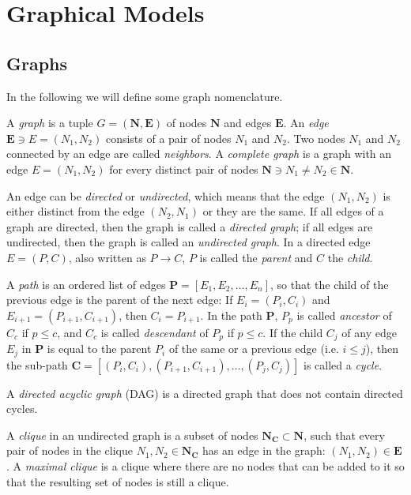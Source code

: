 \section{Graphical Models}

\subsection{Graphs}

In the following we will define some graph nomenclature.

A \emph{graph} is a tuple $G=(\mathbf{N},\mathbf{E})$
of nodes $\mathbf{N}$ and edges $\mathbf{E}$. An \emph{edge}
$\mathbf{E}\ni E=(N_{1},N_{2})$ consists of a pair of nodes $N_{1}$
and $N_{2}$. Two nodes $N_{1}$ and $N_{2}$ connected by an edge
are called \emph{neighbors}. A \emph{complete graph}
is a graph with an edge $E=(N_{1},N_{2})$ for every distinct pair
of nodes $\mathbf{N}\ni N_{1}\neq N_{2}\in\mathbf{N}$.

An edge can be \emph{directed} or \emph{undirected},
which means that the edge $(N_{1},N_{2})$ is either distinct from
the edge $(N_{2},N_{1})$ or they are the same. If all edges of a
graph are directed, then the graph is called a \emph{directed graph};
if all edges are undirected, then the graph is called an \emph{undirected
graph}. In a directed edge $E=(P,C)$, also
written as $P\rightarrow C$, $P$ is called the \emph{parent}
and $C$ the \emph{child}.

A \emph{path} is an ordered list of edges $\mathbf{P}=[E_{1},E_{2},\dots,E_{n}]$,
so that the child of the previous edge is the parent of the next edge:
If $E_{i}=(P_{i},C_{i})$ and $E_{i+1}=(P_{i+1},C_{i+1})$, then $C_{i}=P_{i+1}$.
In the path $\mathbf{P}$, $P_{p}$ is called \emph{ancestor}
of $C_{c}$ if $p\leq c$, and $C_{c}$ is called  \emph{descendant}
of $P_{p}$ if $p\leq c$. If the child $C_{j}$ of any edge $E_{j}$
in $\mathbf{P}$ is equal to the parent $P_{i}$ of the same or a
previous edge (i.e. $i\leq j$), then the sub-path $\mathbf{C}=[(P_{i},C_{i}),(P_{i+1},C_{i+1}),\dots,(P_{j},C_{j})]$
is called a \emph{cycle}.

A \emph{directed acyclic graph} (DAG)
is a directed graph that does not contain directed cycles.

A \emph{clique} in an undirected graph is a subset
of nodes $\mathbf{N_{C}}\subset\mathbf{N}$, such that every pair
of nodes in the clique $N_{1},N_{2}\in\mathbf{N_{C}}$ has an edge
in the graph: $(N_{1},N_{2})\in\mathbf{E}$. A \emph{maximal clique}
is a clique where there are no nodes that can be added to it so that
the resulting set of nodes is still a clique.

